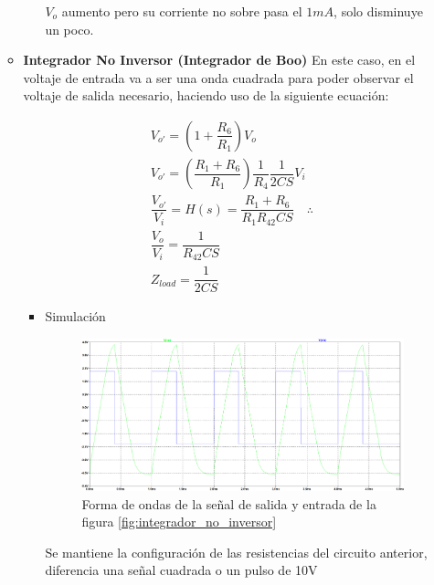 \begin{enumerate}[label=\textbf{\arabic*.}, font=\bfseries]
\begin{itemize}
\begin{itemize}
                    $V_o$ aumento pero su corriente no sobre pasa el $1mA$, solo disminuye un poco.
            \end{itemize}
        \item \textbf{Integrador No Inversor (Integrador de Boo)}
            En este caso, en el voltaje de entrada va a ser una onda cuadrada para poder observar el voltaje de salida necesario, haciendo uso de la siguiente ecuación:

            \begin{gather}
                V_{o'}=\left(1+\dfrac{R_6}{R_1}\right)V_o \nonumber\\[0.5cm]
                V_{o'}=\left(\dfrac{R_1+R_6}{R_1}\right)\dfrac{1}{R_4}\dfrac{1}{2CS}V_i \nonumber\\[0.5cm]
                \dfrac{V_{o'}}{V_i}=H(s)=\dfrac{R_1+R_6}{R_1R_42CS}\quad \therefore \nonumber\\[0.5cm]
                \dfrac{V_o}{V_i}=\dfrac{1}{R_42CS} \label{eqn:H}\\[0.5cm]
                Z_{load}=\dfrac{1}{2CS}
            \end{gather}

            \begin{itemize}
                \item Simulación
                    \begin{figure}[H]
                      \centering
                      \renewcommand{\figurename}{Gráfica}
                      \includegraphics[width=\textwidth]{Imagenes/sim_intnoinver.png}
                      \caption{Forma de ondas de la señal de salida y entrada de la figura \ref{fig:integrador_no_inversor}}
                      \label{fig:sim_intnoinv}
                    \end{figure}

                    Se mantiene la configuración de las resistencias del circuito anterior, diferencia una señal cuadrada o un pulso de 10V
            \end{itemize}
    \end{itemize}
\end{enumerate}

